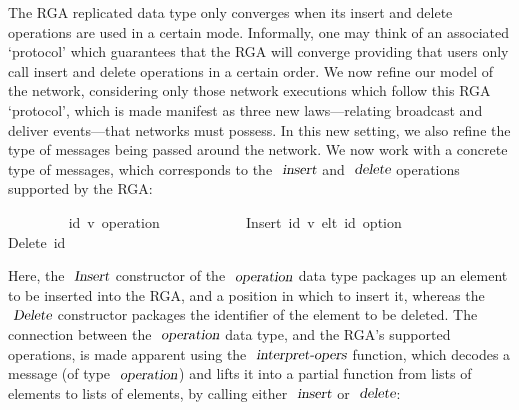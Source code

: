 \documentclass[acmlarge,review,anonymous]{acmart}\settopmatter{printfolios=true}
\begin{document}
The RGA replicated data type only converges when its insert and delete operations are used in a certain mode.
Informally, one may think of an associated `protocol' which guarantees that the RGA will converge providing that users only call insert and delete operations in a certain order.
We now refine our model of the network, considering only those network executions which follow this RGA `protocol', which is made manifest as three new laws---relating broadcast and deliver events---that networks must possess.
In this new setting, we also refine the type of messages being passed around the network.
We now work with a concrete type of messages, which corresponds to the $\isa{insert}$ and $\isa{delete}$ operations supported by the RGA:
\\
\begin{isabellebody}
\ \ \ \ \ \ \ \  {\isacharparenleft}{\isacharprime}id{\isacharcomma}\ {\isacharprime}v{\isacharparenright}\ operation\ \isanewline
\ \ \ \ \ \ \ \ \ \ {\isacharequal} Insert\ {\isachardoublequoteopen}{\isacharparenleft}{\isacharprime}id{\isacharcomma}\ {\isacharprime}v{\isacharparenright}\ elt{\isachardoublequoteclose}\ {\isachardoublequoteopen}{\isacharprime}id\ option{\isachardoublequoteclose}\ \isanewline
\ \ \ \ \ \ \ \ \ \ {\isacharbar} Delete\ {\isachardoublequoteopen}{\isacharprime}id{\isachardoublequoteclose}
\end{isabellebody}
\vspace{\baselineskip}
Here, the $\isa{Insert}$ constructor of the $\isa{operation}$ data type packages up an element to be inserted into the RGA, and a position in which to insert it, whereas the $\isa{Delete}$ constructor packages the identifier of the element to be deleted.
The connection between the $\isa{operation}$ data type, and the RGA's supported operations, is made apparent using the $\isa{interpret-opers}$ function, which decodes a message (of type $\isa{operation}$) and lifts it into a partial function from lists of elements to lists of elements, by calling either $\isa{insert}$ or $\isa{delete}$:
\\
\end{document}
